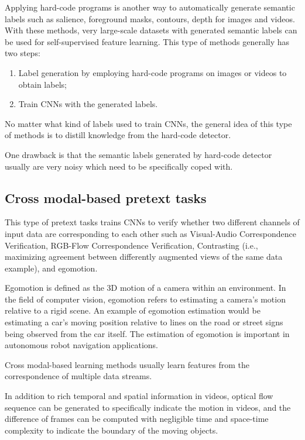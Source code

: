 Applying hard-code programs is another way to automatically generate semantic
labels such as salience, foreground masks, contours, depth for images and videos.
With these methods, very large-scale datasets with generated semantic labels can
be used for self-supervised feature learning. This type of methods generally has
two steps:
\begin{enumerate}
      \item Label generation by employing hard-code programs on images or videos
            to obtain labels;
      \item Train CNNs with the generated labels.
\end{enumerate}

No matter what kind of labels used to train CNNs, the general idea of this type
of methods is to distill knowledge from the hard-code detector.

One drawback is that the semantic labels generated by hard-code detector usually
are very noisy which need to be specifically coped with.

\subsection{Cross modal-based pretext tasks}
This type of pretext tasks trains CNNs to verify whether two different channels
of input data are corresponding to each other such as Visual-Audio Correspondence
Verification, RGB-Flow Correspondence Verification, Contrasting (i.e., maximizing
agreement between differently augmented views of the same data example), and egomotion.

\begin{center}
      Egomotion is defined as the 3D motion of a camera within an environment.
      In the field of computer vision, egomotion refers to estimating a camera's
      motion relative to a rigid scene. An example of egomotion estimation would
      be estimating a car's moving position relative to lines on the road or street
      signs being observed from the car itself. The estimation of egomotion is
      important in autonomous robot navigation applications.
\end{center}

Cross modal-based learning methods usually learn features from the correspondence
of multiple data streams.

In addition to rich temporal and spatial information in videos, optical flow
sequence can be generated to specifically indicate the motion in videos, and the
difference of frames can be computed with negligible time and space-time complexity
to indicate the boundary of the moving objects.

